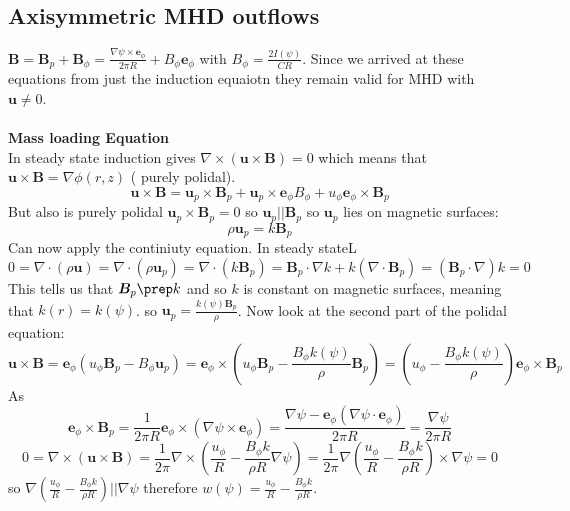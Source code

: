 \documentclass{article}
\begin{document}
        \subsection{Axisymmetric MHD outflows}
        $\bm B = \bm B_p + \bm B_{\phi} = \frac{\nabla \psi \times \bm e_{\phi}}{2 \pi R} + B_{\phi} \bm e_{\phi}$ with $B_{\phi} = \frac{2 I(\psi)}{CR}$. Since we arrived at these equations from just the induction equaiotn they remain valid for MHD with $\bm u \neq 0$.\\\\
                \textbf{Mass loading Equation}\\
                In steady state induction gives $\nabla \times (\bm u \times \bm B) = 0$ which means that $\bm u \times \bm B = \nabla \phi(r,z)$ ( purely polidal). 
                $$
                \bm u \times \bm B = \bm u_p \times \bm B_p + \bm u_p \times \bm e_{\phi} B_{\phi} + u_{\phi} \bm e_{\phi} \times \bm B_p
                $$
                But also is purely polidal $\bm u_p \times \bm B_p = 0$ so $\bm u_p || \bm B_p$ so $\bm u_p$ lies on magnetic surfaces: 
                $$
                \rho \bm u_p = k \bm B_p
                $$
                Can now apply the continiuty equation. In steady stateL
                $$
                0 = \nabla \cdot (\rho \bm u) = \nabla \cdot (\rho \bm u_p) = \nabla \cdot(k \bm B_p) = \bm B_p \cdot \nabla k + k (\nabla \cdot \bm B_p) = (\bm B_p \cdot \nabla) k = 0
                $$
                This tells us that $\bm B_p \prep k$ and so $k$ is constant on magnetic surfaces, meaning that $k(r) = k(\psi)$. so $\bm u_p = \frac{k(\psi) \bm B_p}{\rho}$. Now look at the second part of the polidal equation:
                $$
                \bm u \times \bm B = \bm e_{\phi}( u_{\phi} \bm B_p - B_{\phi} \bm u_p) = \bm e_{\phi} \times (u_{\phi} \bm B_p -\frac{B_{\phi}k(\psi)}{\rho} \bm B_p) = (u_{\phi} - \frac{B_{\phi}k(\psi)}{\rho}) \bm e_{\phi} \times  \bm B_p
        $$
                As
                $$
                \bm e_{\phi} \times \bm B_p = \frac{1}{2\pi R} \bm e_{\phi} \times (\nabla \psi \times \bm e_{\phi}) = \frac{\nabla \psi - \bm e_{\phi} (\nabla \psi \cdot \bm e_{\phi})}{2\pi R} = \frac{ \nabla \psi}{2 \pi R}
        $$
        $$
        0 = \nabla \times( \bm u \times \bm B) = \frac{1}{2\pi} \nabla \times (\frac{ u_{\phi}}{R} - \frac{B_{\phi}k}{\rho R}\nabla \psi) = \frac{1}{2\pi} \nabla( \frac{u_{\phi}}{R} - \frac{B_{\phi}k}{\rho R}) \times \nabla \psi =0
                $$
        so $\nabla( \frac{u_{\phi}}{R} - \frac{B_{\phi}k}{\rho R}) || \nabla \psi$ therefore $w(\psi) = \frac{u_{\phi}}{R} - \frac{B_{\phi}k}{\rho R}$.
\end{document}
